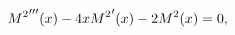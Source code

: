 ${\mathop{M\/}\nolimits^{2}}'''\!\left(x\right)-4x{\mathop{M\/}\nolimits^{2}}'%
\!\left(x\right)-2{\mathop{M\/}\nolimits^{2}}\!\left(x\right)=0,$